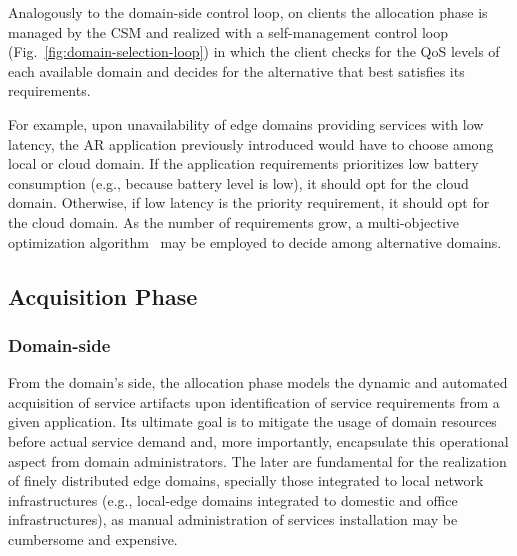 Analogously to the domain-side control loop, on clients the allocation phase is managed by the CSM  and realized with a self-management control loop (Fig.~\ref{fig:domain-selection-loop}) in which the client checks for the QoS levels of each available domain and decides for the alternative that best satisfies its requirements. 

For example, upon unavailability of edge domains providing services with low latency, the AR application previously introduced would have to choose among local or cloud domain. If the application requirements prioritizes low battery consumption (e.g., because battery level is low), it should opt for the cloud domain. Otherwise, if low latency is the priority requirement, it should opt for the cloud domain. As the number of requirements grow, a multi-objective optimization algorithm~\cite{Olson1996} may be employed to decide among alternative domains.






\subsection{Acquisition Phase}\label{sec:A3-E-acquisition}


\subsubsection*{Domain-side} From the domain's side, the allocation phase models the dynamic and automated acquisition of service artifacts upon identification of service requirements from a given application. Its ultimate goal is to mitigate the usage of domain resources before actual service demand and, more importantly, encapsulate this operational aspect from domain administrators. The later are fundamental for the realization of finely distributed edge domains, specially those integrated to local network infrastructures (e.g., local-edge domains integrated to domestic and office infrastructures), as manual administration of services installation may be cumbersome and expensive.


